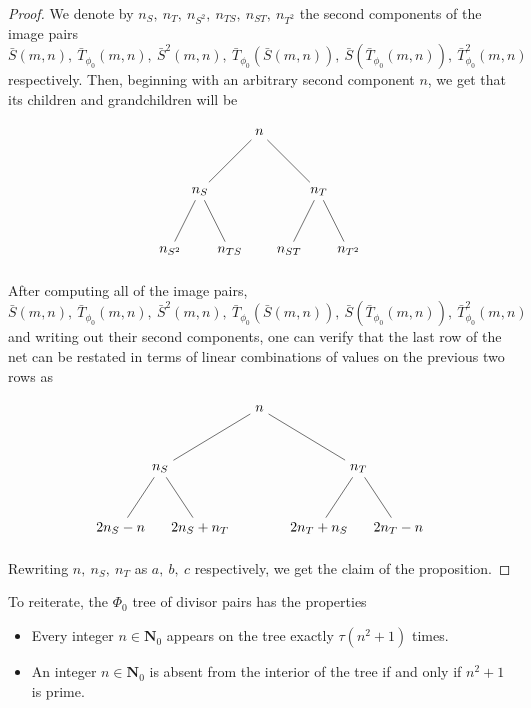 \documentclass{article}
\begin{document}
\begin{proof}
We denote by $n_S, \ n_T, \ n_{S^2}, \ n_{TS}, \ n_{ST}, \ n_{T^2}$ the second components of the image pairs $\bar{S}(m, n), \ \bar{T}_{\phi_0}(m, n), \ \bar{S}^2(m, n), \ \bar{T}_{\phi_0}\left(\bar{S}(m, n)\right), \ \bar{S}\left(\bar{T}_{\phi_0}(m, n)\right), \ \bar{T}^2_{\phi_0}(m, n)$ respectively. Then, beginning with an arbitrary second component $n$, we get that its children and grandchildren will be

$$\begin{tikzpicture}[level distance=1.5cm,
  level 1/.style={sibling distance=3cm},
  level 2/.style={sibling distance=1.5cm}]
  \node {$n$}
    child {node {$n_S$}
      child {node {$n_{S^2}$}}
      child {node {$n_{TS}$}}
    }
    child {node {$n_T$}
      child {node {$n_{ST}$}}
      child {node {$n_{T^2}$}}
    };
\end{tikzpicture}$$

After computing all of the image pairs, $$\bar{S}(m, n), \ \bar{T}_{\phi_0}(m, n), \ \bar{S}^2(m, n), \ \bar{T}_{\phi_0}\left(\bar{S}(m, n)\right), \ \bar{S}\left(\bar{T}_{\phi_0}(m, n)\right), \ \bar{T}^2_{\phi_0}(m, n)$$ and writing out their second components, one can verify that the last row of the net can be restated in terms of linear combinations of values on the previous two rows as

$$\begin{tikzpicture}[level distance=1.5cm,
  level 1/.style={sibling distance=5cm},
  level 2/.style={sibling distance=2cm}]
  \node {$n$}
    child {node {$n_S$}
      child {node {$2n_S -  n$}}
      child {node {$2n_S + n_T$}}
    }
    child {node {$n_T$}
      child {node {$2n_T + n_S$}}
      child {node {$2n_T - n$}}
    };
\end{tikzpicture}$$

Rewriting $n, \ n_S, \ n_T$ as $a, \ b, \ c$ respectively, we get the claim of the proposition.
\end{proof}

To reiterate, the $\Phi_0$ tree of divisor pairs has the properties

\begin{itemize}
    \item Every integer $n \in \mathbf{N}_0$ appears on the tree exactly $\tau(n^2 + 1)$ times. 
    \item An integer $n \in \mathbf{N}_0$ is absent from the interior of the tree if and only if $n^2 + 1$ is prime.
\end{itemize}
\end{document}
